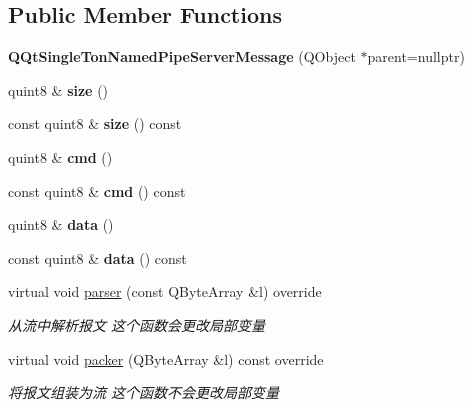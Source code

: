 \subsection*{Public Member Functions}
\begin{DoxyCompactItemize}
\item 
\mbox{\label{class_q_qt_single_ton_named_pipe_server_message_aa3e1ba4f8874030f4802a352f36cf4fd}} 
{\bfseries Q\+Qt\+Single\+Ton\+Named\+Pipe\+Server\+Message} (Q\+Object $\ast$parent=nullptr)
\item 
\mbox{\label{class_q_qt_single_ton_named_pipe_server_message_a7b092c653ec1705ac16795e380d4ea2d}} 
quint8 \& {\bfseries size} ()
\item 
\mbox{\label{class_q_qt_single_ton_named_pipe_server_message_a9dfeab19fedd80502f8edcfcc4340b5b}} 
const quint8 \& {\bfseries size} () const
\item 
\mbox{\label{class_q_qt_single_ton_named_pipe_server_message_aab1ddcb2cba60f26a6a299c1d81f23bd}} 
quint8 \& {\bfseries cmd} ()
\item 
\mbox{\label{class_q_qt_single_ton_named_pipe_server_message_a6c5bedcc57ea3eaf8e83a87854ca6556}} 
const quint8 \& {\bfseries cmd} () const
\item 
\mbox{\label{class_q_qt_single_ton_named_pipe_server_message_ae46ab1c2142be140a4f0bdab48d30b4f}} 
quint8 \& {\bfseries data} ()
\item 
\mbox{\label{class_q_qt_single_ton_named_pipe_server_message_a7cf679c838f46f500577daa472c23af5}} 
const quint8 \& {\bfseries data} () const
\item 
virtual void \mbox{\hyperlink{class_q_qt_single_ton_named_pipe_server_message_a6eaaac1ac3e80c5ff3c637defb735bb7}{parser}} (const Q\+Byte\+Array \&l) override
\begin{DoxyCompactList}\small\item\em 从流中解析报文 这个函数会更改局部变量 \end{DoxyCompactList}\item 
virtual void \mbox{\hyperlink{class_q_qt_single_ton_named_pipe_server_message_a53a8485912978dce143a1365e6e5ed18}{packer}} (Q\+Byte\+Array \&l) const override
\begin{DoxyCompactList}\small\item\em 将报文组装为流 这个函数不会更改局部变量 \end{DoxyCompactList}\end{DoxyCompactItemize}


